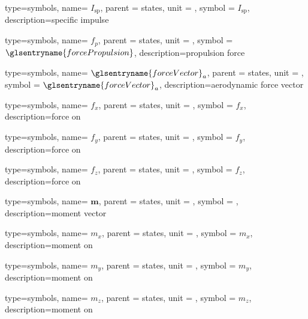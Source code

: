 {type=symbols,
    name= \ensuremath{I_\textrm{sp}},
    parent = {states},
    unit = \unexpanded{\si{\second}},
    symbol = \ensuremath{I_\textrm{sp}},
    description={specific impulse}
}


{type=symbols,
    name= \ensuremath{f_{p}},
    parent = {states},
    unit = \unexpanded{\si{\newton}},
    symbol = \ensuremath{\glsentryname{forcePropulsion}},
    description={propulsion force}
}


{type=symbols,
    name= \ensuremath{{\glsentryname{forceVector}}_{a}},
    parent = {states},
    unit = \unexpanded{},
    symbol = \ensuremath{{\glsentryname{forceVector}}_{a}},
    description={aerodynamic force vector}
}

{type=symbols,
    name= \ensuremath{f_{x}},
    parent = {states},
    unit = \unexpanded{\si{\newton}},
    symbol = \ensuremath{f_{x}},
    description={force on }
}

{type=symbols,
    name= \ensuremath{f_{y}},
    parent = {states},
    unit = \unexpanded{\si{\newton}},
    symbol = \ensuremath{f_{y}},
    description={force on }
}

{type=symbols,
    name= \ensuremath{f_{z}},
    parent = {states},
    unit = \unexpanded{\si{\newton}},
    symbol = \ensuremath{f_{z}},
    description={force on }
}


{type=symbols,
    name= \ensuremath{\mathbf{m}},
    parent = {states},
    unit = \unexpanded{},
    symbol = ,
    description={moment vector}
}

{type=symbols,
    name= \ensuremath{m_{x}},
    parent = {states},
    unit = \unexpanded{\si{\newton\meter}},
    symbol = \ensuremath{m_{x}},
    description={moment on }
}

{type=symbols,
    name= \ensuremath{m_{y}},
    parent = {states},
    unit = \unexpanded{\si{\newton\meter}},
    symbol = \ensuremath{m_{y}},
    description={moment on }
}

{type=symbols,
    name= \ensuremath{m_{z}},
    parent = {states},
    unit = \unexpanded{\si{\newton\meter}},
    symbol = \ensuremath{m_{z}},
    description={moment on }
}

